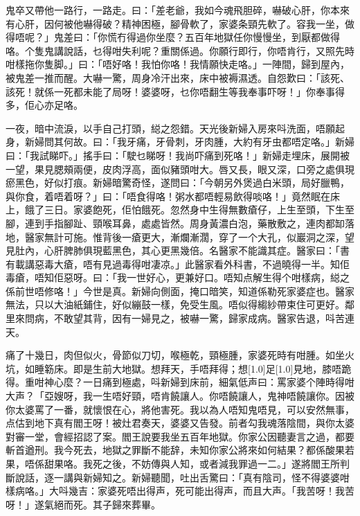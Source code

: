 \documentclass[a5paper, 12pt, openany]{book} %
\begin{document}
	鬼卒又帶他一路行，一路走。曰：「差老爺，我如今魂飛胆碎，嚇破心肝，你本來有心肝，因何被他嚇得破？精神困極，腳骨軟了，家婆条頸先軟了。容我一坐，做得唔呢？」鬼差曰：「你慌冇得過你坐麼？五百年地獄任你慢慢坐，到厭都做得咯。个隻鬼講說話，乜得咁失利呢？重關係過。你願行即行，你唔肯行，又照先時咁樣拖你隻脚。」曰：「唔好咯！我怕你咯！我情願快走咯。」一陣間，歸到屋內，被鬼差一推而醒。大嚇一驚，周身冷汗出來，床中被褥濕透。自怨歎曰：「該死、該死！就係一死都未能了局呀！婆婆呀，乜你唔翻生等我奉事吓呀！」你奉事得多，佢心亦足咯。

	一夜，暗中流淚，以手自己打頭，縂之怨錯。天光後新婦入房來呌洗面，唔願起身，新婦問其何故。曰：「我牙痛，牙骨刺，牙肉腫，大約有牙虫都唔定咯。」新婦曰：「我試睇吓。」搖手曰：「駛乜睇呀！我尚吓痛到死咯！」新婦走埋床，展開被一望，果見腮頰兩便，皮肉浮高，面似豬頭咁大。唇又長，眼又深，口旁之處俱現瘀黑色，好似打痕。新婦暗驚奇怪，遂問曰：「今朝另外煲過白米頭，局好臘鴨，與你食，着唔着呀？」曰：「唔食得咯！粥水都唔輕易飲得啖咯！」竟然眠在床上，餓了三日。家婆飽死，佢怕餓死。忽然身中生得無數瘡仔，上生至頭，下生至腳，連到手指腳趾、頸喉耳鼻，處處皆然。周身黃濃白泡，藥散敷之，連肉都缷落地，醫家無計可施。惟背後一瘡更大，漸爛漸濶，穿了一个大孔，似巖洞之深，望見肚內，心肝脾肺俱現藍黑色，其心更黑幾倍。名醫家不能識其症。醫家曰：「書有載講惡毒大瘡，唔有見過毒得咁凄凉。」此醫家看外科書，不過曉得一半。知佢毒瘡，唔知佢惡呀。曰：「我一世好心，更兼好口。唔知点解生得个咁樣病，縂之係前世唔修咯！」今世是真。新婦向側面，掩口暗笑，知道係勒死家婆症也。醫家無法，只以大油紙鋪住，好似繃鼓一樣，免受生風。唔似得縐紗帶束住可更好。鄰里來問病，不敢望其背，因有一婦見之，被嚇一驚，歸家成病。醫家告退，呌苦連天。

	痛了十幾日，肉但似火，骨節似刀切，喉極乾，頸極腫，家婆死時有咁腫。如坐火坑，如睡簕床。即是生前大地獄。想拜天，手唔拜得；想\scalebox{0.5}[1.0]{足}\scalebox{0.5}[1.0]{見}地，膝唔跪得。重咁神心麼？一日痛到極處，呌新婦到床前，細氣低声曰：罵家婆个陣時得咁大声？「亞嫂呀，我一生唔好頸，唔肯饒讓人。你唔饒讓人，鬼神唔饒讓你。因被你太婆罵了一番，就懷恨在心，將他害死。我以為人唔知鬼唔見，可以安然無事，点估到地下真有閻王呀！被灶君奏天，婆婆又告發。前者勾我魂落陰間，與你太婆對審一堂，會經招認了案。閻王說要我坐五百年地獄。你家公因聽妻言之過，都要斬首遒刑。我今死去，地獄之罪斷不能辞，未知你家公將來如何結果？都係酸果若果，唔係甜果咯。我死之後，不妨傳與人知，或者減我罪過一二。」遂將閻王所判斷說話，逐一講與新婦知之。新婦聽聞，吐出舌驚曰：「真有陰司，怪不得婆婆咁樣病咯。」大呌幾吉：家婆死唔出得声，死可能出得声，而且大声。「我苦呀！我苦呀！」遂氣絕而死。其子歸來葬畢。
\end{document}
